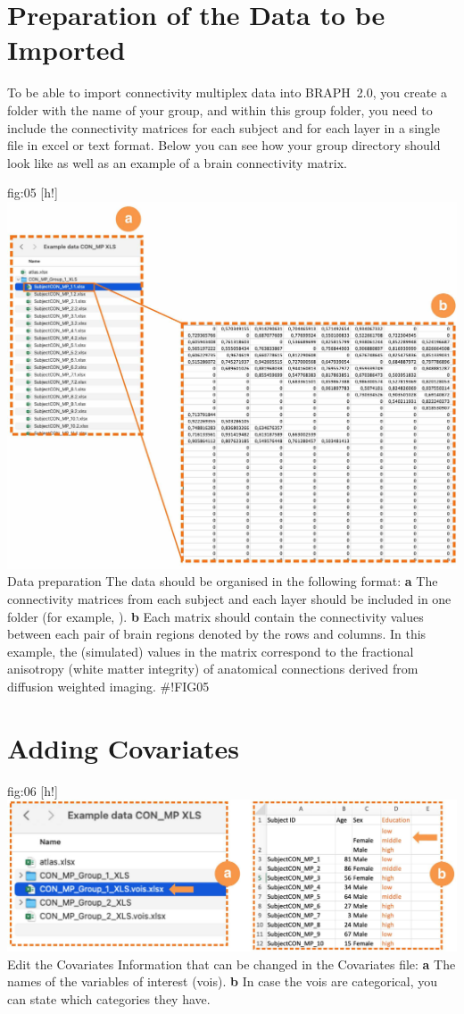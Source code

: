 \documentclass[justified]{tufte-handout}
\begin{document}
\clearpage
\section{Preparation of the Data to be Imported}

To be able to import connectivity multiplex data into BRAPH~2.0, you create a folder with the name of your group, and within this group folder, you need to include the connectivity matrices for each subject and for each layer in a single file in excel or text format. Below you can see how your group directory should look like as well as an example of a brain connectivity matrix.

	{fig:05}
	{
	[h!]
	\includegraphics{fig05.jpg}
	}
	{Data preparation}
	{
	The data should be organised in the following format:
	{\bf a} The connectivity matrices from each subject and each layer should be included in one folder (for example, ). 
	{\bf b} Each matrix should contain the connectivity values between each pair of brain regions denoted by the rows and columns. In this example, the (simulated) values in the matrix correspond to the fractional anisotropy (white matter integrity) of anatomical connections derived from diffusion weighted imaging.
	}
#!FIG05

\section{Adding Covariates}

	{fig:06}
	{
	[h!]
	\includegraphics{fig06.jpg}
	}
	{Edit the Covariates}
	{
	Information that can be changed in the Covariates file: 
	{\bf a} The names of the variables of interest (vois).
	{\bf b} In case the vois are categorical, you can state which categories they have.
	}
	
\end{document}
